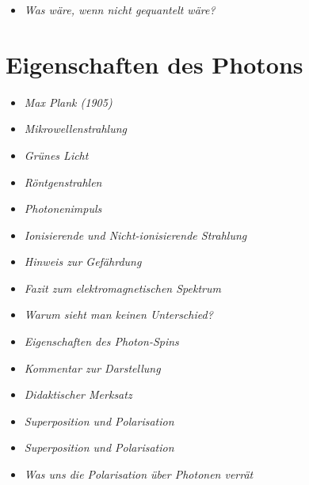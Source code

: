 \vspace{1em}
\begin{tcolorbox}[title=hypothetische Boxen,hypobox]
\begin{itemize}
	\item \emph{Was wäre, wenn nicht gequantelt wäre?} \dotfill\pageref{box:hypo-keine-quanten}
\end{itemize}
\end{tcolorbox}


\section{Eigenschaften des Photons}
\vspace{1em}
\begin{tcolorbox}[title=physikalische Boxen,physikbox]

\begin{itemize}
	\item \emph{Max Plank (1905)} \dotfill\pageref{box:planck1948}
	\item \emph{Mikrowellenstrahlung}\dotfill\pageref{box:Mikrowellenstrahlung}
	\item \emph{Grünes Licht} \dotfill\pageref{box:grünesLicht}
	\item \emph{Röntgenstrahlen} \dotfill\pageref{box:röntgenstrahlen}
	\item \emph{Photonenimpuls} \dotfill\pageref{box:Photonenimpuls}
	\item \emph{Ionisierende und Nicht-ionisierende Strahlung} \dotfill\pageref{box:ionisierende}
	\item \emph{Hinweis zur Gefährdung} \dotfill\pageref{box:Hinweis zur Gefärdung}
	\item \emph{Fazit zum elektromagnetischen Spektrum} \dotfill\pageref{box:Fazit zum elektro}
	\item \emph{Warum sieht man keinen Unterschied?} \dotfill\pageref{box:Warum sieht man}
    \item \emph{Eigenschaften des Photon-Spins} \dotfill\pageref{box:Eigenschaften des}
	\item \emph{Kommentar zur Darstellung}\dotfill\pageref{box:Kommentar zur Darstellung}
	\item \emph{Didaktischer Merksatz} \dotfill\pageref{box:didaktischerMerksatz}
	\item \emph{Superposition und Polarisation} \dotfill\pageref{box:Superposition}
	\item \emph{Superposition und Polarisation}\dotfill\pageref{box:Superposition und Polarisation}
	\item \emph{Was uns die Polarisation über Photonen verrät} \dotfill\pageref{box:Was uns die}

\end{itemize}
\end{tcolorbox}

